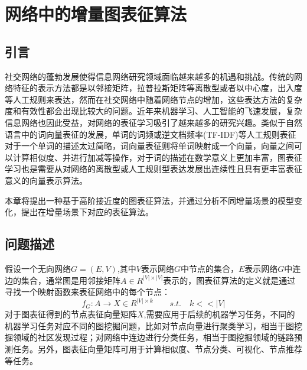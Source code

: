 \chapter{网络中的增量图表征算法}
\section{引言}
	社交网络的蓬勃发展使得信息网络研究领域面临越来越多的机遇和挑战。传统的网络特征的表示方法都是以邻接矩阵，拉普拉斯矩阵等离散型或者以中心度，出入度等人工规则来表达，然而在社交网络中随着网络节点的增加，这些表达方法的复杂度和有效性都会出现比较大的问题。近年来机器学习、人工智能的飞速发展，复杂信息网络也因此受益，对网络的表征学习吸引了越来越多的研究兴趣。类似于自然语言中的词向量表征的发展，单词的词频或逆文档频率(TF-IDF)等人工规则表征对于一个单词的描述太过简略，词向量表征则将单词映射成一个向量，向量之间可以计算相似度、并进行加减等操作，对于词的描述在数学意义上更加丰富，图表征学习也是需要从对网络的离散型或人工规则型表达发展出连续性且具有更丰富表征意义的向量表示算法。
	
	本章将提出一种基于高阶接近度的图表征算法，并通过分析不同增量场景的模型变化，提出在增量场景下对应的表征算法。
	
\section{问题描述}
假设一个无向网络$G=(E,V)$,其中$V$表示网络$G$中节点的集合，$E$表示网络$G$中连边的集合，通常图是用邻接矩阵$A \in R^{|V|\times|V|}$表示的，图表征算法的定义就是通过寻找一个映射函数来表征网络中的每个节点：
\begin{equation}
f_G: A \rightarrow X \in R^{|V| \times k} \qquad s.t.\quad k<<|V|
\end{equation}
对于图表征得到的节点表征向量矩阵$X$,需要应用于后续的机器学习任务，不同的机器学习任务对应不同的图挖掘问题，比如对节点向量进行聚类学习，相当于图挖掘领域的社区发现过程；对网络中连边进行分类任务，相当于图挖掘领域的链路预测任务。另外，图表征向量矩阵可用于计算相似度、节点分类、可视化、节点推荐等任务。

